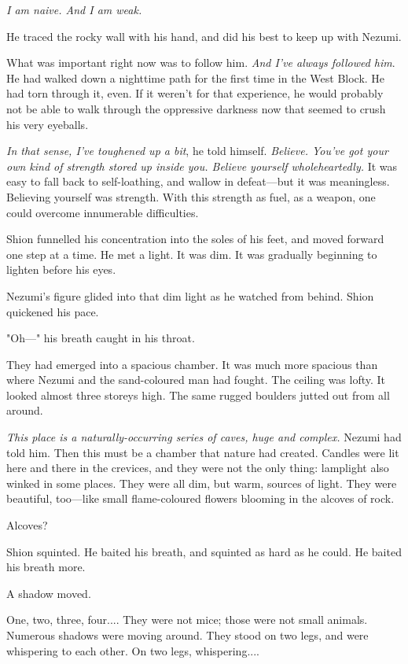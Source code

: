 \emph{I am naive. And I am weak.}

He traced the rocky wall with his hand, and did his best to keep up with
Nezumi.

What was important right now was to follow him. \emph{And I've always followed
him}. He had walked down a nighttime path for the first time in the West
Block. He had torn through it, even. If it weren't for that experience,
he would probably not be able to walk through the oppressive darkness
now that seemed to crush his very eyeballs.

\emph{In that sense, I've toughened up a bit}, he told himself. \emph{Believe. You've
got your own kind of strength stored up inside you. Believe yourself
wholeheartedly.} It was easy to fall back to self-loathing, and wallow in
defeat---but it was meaningless. Believing yourself was strength. With
this strength as fuel, as a weapon, one could overcome innumerable
difficulties.

Shion funnelled his concentration into the soles of his feet, and moved
forward one step at a time. He met a light. It was dim. It was gradually
beginning to lighten before his eyes.

Nezumi's figure glided into that dim light as he watched from behind.
Shion quickened his pace.

"Oh---" his breath caught in his throat.

They had emerged into a spacious chamber. It was much more spacious than
where Nezumi and the sand-coloured man had fought. The ceiling was
lofty. It looked almost three storeys high. The same rugged boulders
jutted out from all around.

\emph{This place is a naturally-occurring series of caves, huge and complex.}
Nezumi had told him. Then this must be a chamber that nature had
created. Candles were lit here and there in the crevices, and they were
not the only thing: lamplight also winked in some places. They were all
dim, but warm, sources of light. They were beautiful, too---like small
flame-coloured flowers blooming in the alcoves of rock.

Alcoves?

Shion squinted. He baited his breath, and squinted as hard as he could.
He baited his breath more.

A shadow moved.

One, two, three, four.... They were not mice; those were not small
animals. Numerous shadows were moving around. They stood on two legs,
and were whispering to each other. On two legs, whispering....

